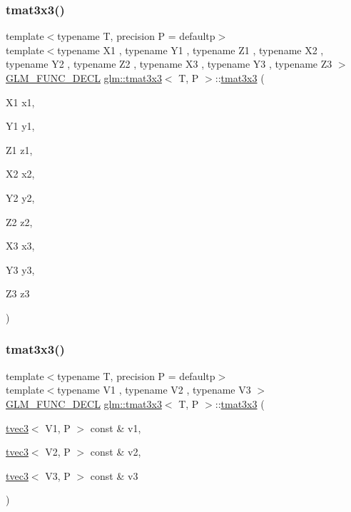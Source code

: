 \subsubsection{\texorpdfstring{tmat3x3()}{tmat3x3()}\hspace{0.1cm}{\footnotesize\ttfamily [8/22]}}
{\footnotesize\ttfamily template$<$typename T, precision P = defaultp$>$ \\
template$<$typename X1 , typename Y1 , typename Z1 , typename X2 , typename Y2 , typename Z2 , typename X3 , typename Y3 , typename Z3 $>$ \\
\mbox{\hyperlink{setup_8hpp_ab2d052de21a70539923e9bcbf6e83a51}{G\+L\+M\+\_\+\+F\+U\+N\+C\+\_\+\+D\+E\+CL}} \mbox{\hyperlink{structglm_1_1tmat3x3}{glm\+::tmat3x3}}$<$ T, P $>$\+::\mbox{\hyperlink{structglm_1_1tmat3x3}{tmat3x3}} (\begin{DoxyParamCaption}\item[{X1}]{x1,  }\item[{Y1}]{y1,  }\item[{Z1}]{z1,  }\item[{X2}]{x2,  }\item[{Y2}]{y2,  }\item[{Z2}]{z2,  }\item[{X3}]{x3,  }\item[{Y3}]{y3,  }\item[{Z3}]{z3 }\end{DoxyParamCaption})}

\mbox{\label{structglm_1_1tmat3x3_aa124ab387668b4444834f36fb7b02a9d}} 
\subsubsection{\texorpdfstring{tmat3x3()}{tmat3x3()}\hspace{0.1cm}{\footnotesize\ttfamily [9/22]}}
{\footnotesize\ttfamily template$<$typename T, precision P = defaultp$>$ \\
template$<$typename V1 , typename V2 , typename V3 $>$ \\
\mbox{\hyperlink{setup_8hpp_ab2d052de21a70539923e9bcbf6e83a51}{G\+L\+M\+\_\+\+F\+U\+N\+C\+\_\+\+D\+E\+CL}} \mbox{\hyperlink{structglm_1_1tmat3x3}{glm\+::tmat3x3}}$<$ T, P $>$\+::\mbox{\hyperlink{structglm_1_1tmat3x3}{tmat3x3}} (\begin{DoxyParamCaption}\item[{\mbox{\hyperlink{structglm_1_1tvec3}{tvec3}}$<$ V1, P $>$ const \&}]{v1,  }\item[{\mbox{\hyperlink{structglm_1_1tvec3}{tvec3}}$<$ V2, P $>$ const \&}]{v2,  }\item[{\mbox{\hyperlink{structglm_1_1tvec3}{tvec3}}$<$ V3, P $>$ const \&}]{v3 }\end{DoxyParamCaption})}

